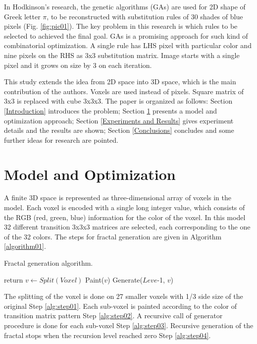 \documentclass{llncs}
\begin{document}
In Hodkinson's research, the genetic algorithms (GAs) are used for 2D shape of Greek letter $\pi$, to be reconstructed with substitution rules of 30 shades of blue pixels (Fig. \ref{fig:pic01}). The key problem in this research is which rules to be selected to achieved the final goal. GAs is a promising approach for such kind of combinatorial optimization. A single rule has LHS pixel with particular color and nine pixels on the RHS as 3x3 substitution matrix. Image starts with a single pixel and it grows on size by 3 on each iteration. 

This study extends the idea from 2D space into 3D space, which is the main contribution of the authors. Voxels are used instead of pixels. Square matrix of 3x3 is replaced with cube 3x3x3. The paper is organized as follows: Section \ref{Introduction} introduces the problem; Section \ref{Model and Optimization} presents a model and optimization approach; Section \ref{Experiments and Results} gives experiment details and the results are shown; Section \ref{Conclusions} concludes and some further ideas for research are pointed.

\section{Model and Optimization} \label{Model and Optimization}

A finite 3D space is represented as three-dimensional array of voxels in the model. Each voxel is encoded with a single long integer value, which consists of the RGB (red, green, blue) information for the color of the voxel. In this model 32 different transition 3x3x3 matrices are selected, each corresponding to the one of the 32 colors. The steps for fractal generation are given in Algorithm \ref{algorithm01}.

\begin{algorithm}
\caption{Fractal generation algorithm.}\label{algorithm01}
\begin{algorithmic}[1]
  \State return\label{alg:step04}
\EndIf
\State $v\gets Split(Voxel)$\label{alg:step01}
  \State Paint($v$)\label{alg:step02}
  \State Generate($Leve$-1, $v$)\label{alg:step03}
\EndFor
\EndProcedure
\end{algorithmic}
\end{algorithm}
\FloatBarrier

The splitting of the voxel is done on 27 smaller voxels with 1/3 side size of the original Step \ref{alg:step01}. Each sub-voxel is painted according to the color of transition matrix pattern Step \ref{alg:step02}. A recursive call of generator procedure is done for each sub-voxel Step \ref{alg:step03}. Recursive generation of the fractal stops when the recursion level reached zero Step \ref{alg:step04}.
\end{document}
